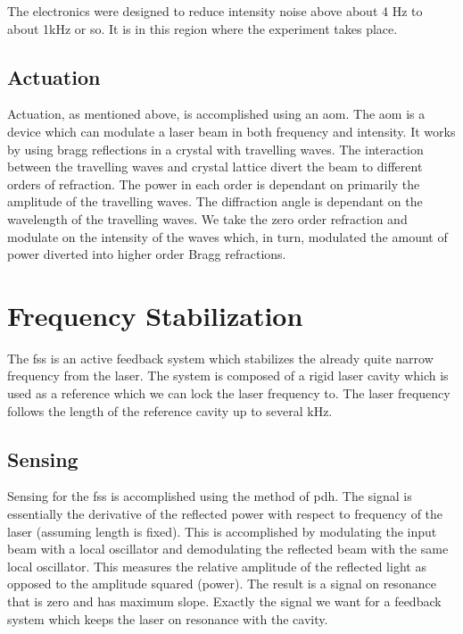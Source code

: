 The electronics were designed to reduce intensity noise above about 4 Hz to
about 1kHz or so. It is in this region where the experiment takes place.

\subsection{Actuation}

Actuation, as mentioned above, is accomplished using an \ac{aom}. The
\ac{aom} is a device which can modulate a laser beam in both frequency
and intensity. It works by using bragg reflections in a crystal with
travelling waves. The interaction between the travelling waves and crystal
lattice divert the beam to different orders of refraction. The power in each
order is dependant on primarily the amplitude of the travelling waves. The
diffraction angle is dependant on the wavelength of the travelling waves.
We take the zero order refraction and modulate on the intensity of the
waves which, in turn, modulated the amount of power diverted into higher order
Bragg refractions.

\section{Frequency Stabilization}

The \ac{fss} is an active feedback system which stabilizes the already quite
narrow frequency from the laser. The system is composed of a rigid laser cavity
which is used as a reference which we can lock the laser frequency to. The
laser frequency follows the length of the reference cavity up to several kHz.

\subsection{Sensing}

Sensing for the \ac{fss} is accomplished using the method of \ac{pdh}. The
signal is essentially the derivative of the reflected power with respect to
frequency of the laser (assuming length is fixed). This is accomplished by
modulating the input beam with a local oscillator and demodulating the
reflected beam with the same local oscillator. This measures the relative
amplitude of the reflected light as opposed to the amplitude squared (power).
The result is a signal on resonance that is zero and has maximum slope.
Exactly the signal we want for a feedback system which keeps the laser on
resonance with the cavity.

